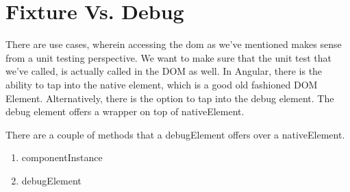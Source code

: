 \maketitle{}
\section{ Fixture Vs. Debug }

There are use cases, wherein accessing the dom as we've mentioned makes sense
from a unit testing perspective. We want to make sure that the unit test that
we've called, is actually called in the DOM as well. In Angular, there is the
ability to tap into the native element, which is a good old fashioned DOM
Element. Alternatively, there is the option to tap into the debug element. The
debug element offers a wrapper on top of nativeElement.

There are a couple of methods that a debugElement offers over a nativeElement.
\begin{enumerate}
  \item componentInstance
  \item debugElement
\end{enumerate}
